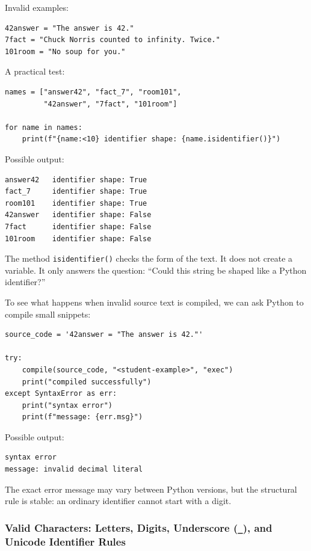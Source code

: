 Invalid examples:

\begin{verbatim}
42answer = "The answer is 42."
7fact = "Chuck Norris counted to infinity. Twice."
101room = "No soup for you."
\end{verbatim}

A practical test:

\begin{verbatim}
names = ["answer42", "fact_7", "room101",
         "42answer", "7fact", "101room"]

for name in names:
    print(f"{name:<10} identifier shape: {name.isidentifier()}")
\end{verbatim}

Possible output:

\begin{verbatim}
answer42   identifier shape: True
fact_7     identifier shape: True
room101    identifier shape: True
42answer   identifier shape: False
7fact      identifier shape: False
101room    identifier shape: False
\end{verbatim}

The method \texttt{isidentifier()} checks the form of the text. It does not create a variable. It only answers the question: ``Could this string be shaped like a Python identifier?''

To see what happens when invalid source text is compiled, we can ask Python to compile small snippets:

\begin{verbatim}
source_code = '42answer = "The answer is 42."'

try:
    compile(source_code, "<student-example>", "exec")
    print("compiled successfully")
except SyntaxError as err:
    print("syntax error")
    print(f"message: {err.msg}")
\end{verbatim}

Possible output:

\begin{verbatim}
syntax error
message: invalid decimal literal
\end{verbatim}

The exact error message may vary between Python versions, but the structural rule is stable: an ordinary identifier cannot start with a digit.

\subsubsection{Valid Characters: Letters, Digits, Underscore (\texttt{\_}), and Unicode Identifier Rules}

